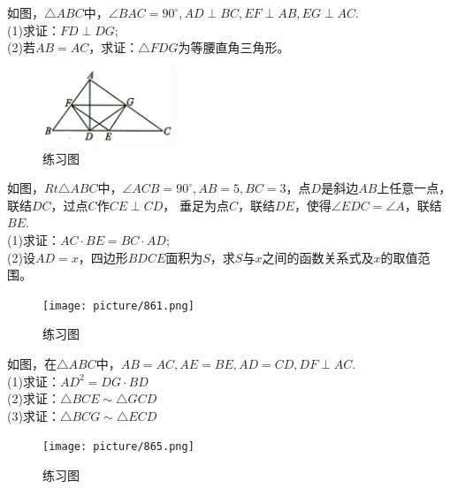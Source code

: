 \documentclass{ecnuthesis}
\begin{document}
\begin{problem}
    如图，$\triangle ABC$中，$\angle BAC=90^\circ,AD\perp BC,EF\perp AB,EG\perp AC$. \\
    (1)求证：$FD\perp DG$; \\
    (2)若$AB=AC$，求证：$\triangle FDG$为等腰直角三角形。
\end{problem}
\begin{figure}[H]
\centering
\includegraphics[width=4cm]{picture/845.png}
\caption{练习图}
\end{figure}
\begin{problem}
    如图，$Rt\triangle ABC$中，$\angle ACB=90^\circ,AB=5,BC=3$，点$D$是斜边$AB$上任意一点，联结$DC$，过点$C$作$CE\perp CD$，
    垂足为点$C$，联结$DE$，使得$\angle EDC=\angle A$，联结$BE$. \\
    (1)求证：$AC·BE=BC·AD$; \\
    (2)设$AD=x$，四边形$BDCE$面积为$S$，求$S$与$x$之间的函数关系式及$x$的取值范围。
\end{problem}
\begin{figure}[H]
\centering
\texttt{[image: picture/861.png]}
\caption{练习图}
\end{figure}
\begin{problem}
    如图，在$\triangle ABC$中，$AB=AC,AE=BE,AD=CD,DF\perp AC$. \\
    (1)求证：$AD^2=DG·BD$ \\
    (2)求证：$\triangle BCE \sim \triangle GCD$ \\
    (3)求证：$\triangle BCG \sim \triangle ECD$
\end{problem}
\begin{figure}[H]
\centering
\texttt{[image: picture/865.png]}
\caption{练习图}
\end{figure}
\clearpage
\end{document}

